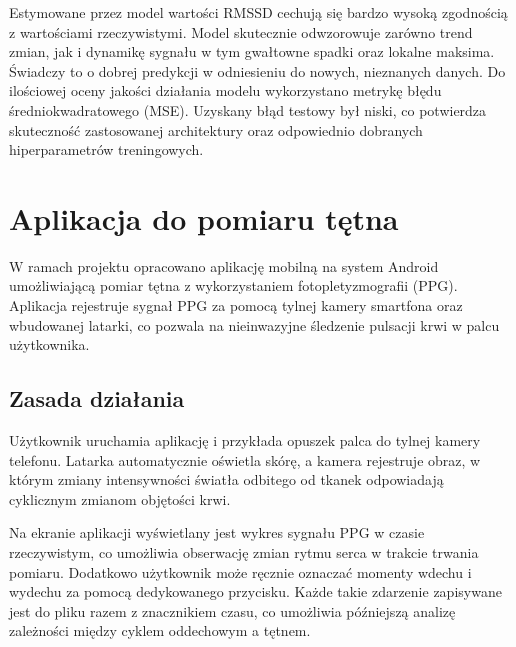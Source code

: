 \documentclass{article}
\begin{document}
Estymowane przez model wartości RMSSD cechują się bardzo wysoką zgodnością z wartościami rzeczywistymi. Model skutecznie odwzorowuje zarówno trend zmian, jak i dynamikę sygnału w tym gwałtowne spadki oraz lokalne maksima. Świadczy to o dobrej predykcji w odniesieniu do nowych, nieznanych danych.
Do ilościowej oceny jakości działania modelu wykorzystano metrykę błędu średniokwadratowego (MSE). Uzyskany błąd testowy był niski, co potwierdza skuteczność zastosowanej architektury oraz odpowiednio dobranych hiperparametrów treningowych.

\newpage
\section{Aplikacja do pomiaru tętna}
W ramach projektu opracowano aplikację mobilną na system Android umożliwiającą pomiar tętna z wykorzystaniem fotopletyzmografii (PPG). Aplikacja rejestruje sygnał PPG za pomocą tylnej kamery smartfona oraz wbudowanej latarki, co pozwala na nieinwazyjne śledzenie pulsacji krwi w palcu użytkownika.

\subsection{Zasada działania}
Użytkownik uruchamia aplikację i przykłada opuszek palca do tylnej kamery telefonu. Latarka automatycznie oświetla skórę, a kamera rejestruje obraz, w którym zmiany intensywności światła odbitego od tkanek odpowiadają cyklicznym zmianom objętości krwi.

Na ekranie aplikacji wyświetlany jest wykres sygnału PPG w czasie rzeczywistym, co umożliwia obserwację zmian rytmu serca w trakcie trwania pomiaru. Dodatkowo użytkownik może ręcznie oznaczać momenty wdechu i wydechu za pomocą dedykowanego przycisku. Każde takie zdarzenie zapisywane jest do pliku razem z znacznikiem czasu, co umożliwia późniejszą analizę zależności między cyklem oddechowym a tętnem.
\end{document}

